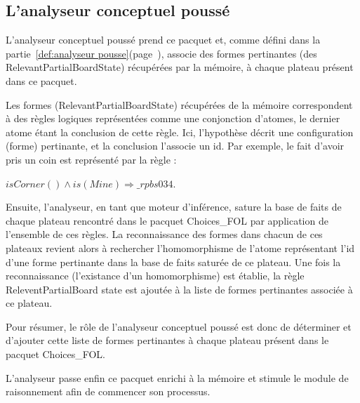 \subsection{L'analyseur conceptuel poussé}
L'analyseur conceptuel poussé prend ce pacquet et, comme défini dans la partie~\ref{def:analyseur pousse}(page~\pageref{def:analyseur pousse}), associe des formes pertinantes (des RelevantPartialBoardState) récupérées par la mémoire, à chaque plateau présent dans ce pacquet. 

Les formes (RelevantPartialBoardState) récupérées de la mémoire correspondent à des règles logiques représentées comme une conjonction d'atomes, le dernier atome étant la conclusion de cette règle. Ici, l'hypothèse décrit une configuration (forme) pertinante, et la conclusion l'associe un id. Par exemple, le fait d'avoir pris un coin est représenté par la règle :

\textit{$isCorner() \wedge is(Mine) \Longrightarrow \_rpbs034$}. 

Ensuite, l'analyseur, en tant que moteur d'inférence, sature la base de faits de chaque plateau rencontré dans le pacquet Choices\_FOL par application de l'ensemble de ces règles. La reconnaissance des formes dans chacun de ces plateaux revient alors à rechercher l'homomorphisme de l'atome représentant l'id d'une forme pertinante dans la base de faits saturée de ce plateau. Une fois la reconnaissance (l'existance d'un homomorphisme) est établie, la règle ReleventPartialBoard state est ajoutée à la liste de formes pertinantes associée à ce plateau.

Pour résumer, le rôle de l'analyseur conceptuel poussé est donc de déterminer et d'ajouter cette liste de formes pertinantes à chaque plateau présent dans le pacquet Choices\_FOL. 

L'analyseur passe enfin ce pacquet enrichi à la mémoire et stimule le module de raisonnement afin de commencer son processus. 